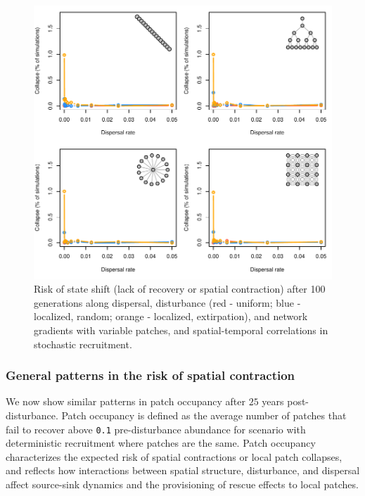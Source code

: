 \documentclass[]{article}
\begin{document}
\begin{figure}[H]

{\centering \includegraphics{Managing_for_ecological_surprises_in_metapopulations_files/figure-latex/state shifts with variable patches and space-time stochasticity-1} 

}

\caption{Risk of state shift (lack of recovery or spatial contraction) after 100 generations along dispersal, disturbance (red - uniform; blue - localized, random; orange - localized, extirpation), and network gradients with variable patches, and spatial-temporal correlations in stochastic recruitment.}\label{fig:state shifts with variable patches and space-time stochasticity}
\end{figure}

\newpage

\hypertarget{general-patterns-in-the-risk-of-spatial-contraction}{%
\subsubsection{General patterns in the risk of spatial
contraction}\label{general-patterns-in-the-risk-of-spatial-contraction}}

We now show similar patterns in patch occupancy after \(25\) years
post-disturbance. Patch occupancy is defined as the average number of
patches that fail to recover above \texttt{0.1} pre-disturbance
abundance for scenario with deterministic recruitment where patches are
the same. Patch occupancy characterizes the expected risk of spatial
contractions or local patch collapses, and reflects how interactions
between spatial structure, disturbance, and dispersal affect source-sink
dynamics and the provisioning of rescue effects to local patches.
\end{document}
